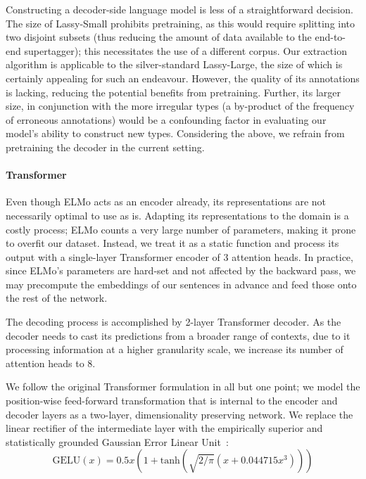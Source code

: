 Constructing a decoder-side language model is less of a straightforward decision.
The size of Lassy-Small prohibits pretraining, as this would require splitting into two disjoint subsets (thus reducing the amount of data available to the end-to-end supertagger); this necessitates the use of a different corpus.
Our extraction algorithm is applicable to the silver-standard Lassy-Large, the size of which is certainly appealing for such an endeavour.
However, the quality of its annotations is lacking, reducing the potential benefits from pretraining.
Further, its larger size, in conjunction with the more irregular types (a by-product of the frequency of erroneous annotations) would be a confounding factor in evaluating our model's ability to construct new types.
Considering the above, we refrain from pretraining the decoder in the current setting.

\paragraph{Transformer} Even though ELMo acts as an encoder already, its representations are not necessarily optimal to use as is.
Adapting its representations to the domain is a costly process; ELMo counts a very large number of parameters, making it prone to overfit our dataset.
Instead, we treat it as a static function and process its output with a single-layer Transformer encoder of 3 attention heads.
In practice, since ELMo's parameters are hard-set and not affected by the backward pass, we may precompute the embeddings of our sentences in advance and feed those onto the rest of the network.

The decoding process is accomplished by 2-layer Transformer decoder. 
As the decoder needs to cast its predictions from a broader range of contexts, due to it processing information at a higher granularity scale, we increase its number of attention heads to 8.

We follow the original Transformer formulation in all but one point; we model the position-wise feed-forward transformation that is internal to the encoder and decoder layers as a two-layer, dimensionality preserving network.
We replace the linear rectifier of the intermediate layer with the empirically superior and statistically grounded Gaussian Error Linear Unit~\cite{gelu}:
\[
\text{GELU}(x) = 0.5x 
\left ( 
    1+\text{tanh}
        \left (
            \sqrt{2/\pi}
                \left (
                    x+0.044715x^3
                \right )
        \right )
\right )
\]

